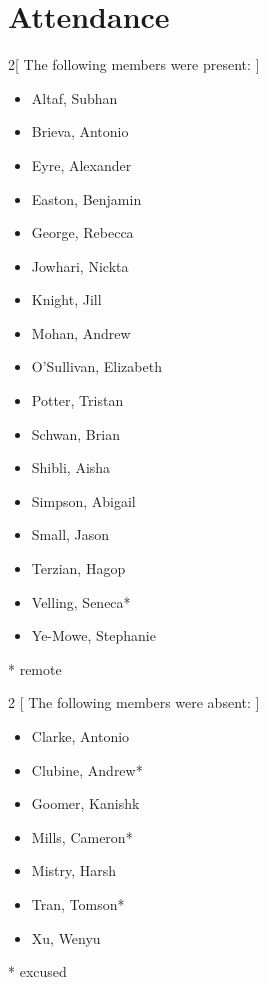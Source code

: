 \section*{Attendance}

\begin{multicols}{2}[
        The following members were present:
    ]

\begin{itemize}
    \item Altaf, Subhan
    \item Brieva, Antonio
    \item Eyre, Alexander
    \item Easton, Benjamin
    \item George, Rebecca
    \item Jowhari, Nickta 
    \item Knight, Jill
    \item Mohan, Andrew
    \item O'Sullivan, Elizabeth
    \item Potter, Tristan
    \item Schwan, Brian
    \item Shibli, Aisha
    \item Simpson, Abigail
    \item Small, Jason
    \item Terzian, Hagop
    \item Velling, Seneca*
    \item Ye-Mowe, Stephanie
\end{itemize}

\end{multicols}
* remote \\

\begin{multicols}{2}
    [
        The following members were absent:
    ]
\begin{itemize}
    \item Clarke, Antonio
    \item Clubine, Andrew*
    \item Goomer, Kanishk
    \item Mills, Cameron*
    \item Mistry, Harsh
    \item Tran, Tomson*
    \item Xu, Wenyu
\end{itemize}
\end{multicols}
* excused\\


